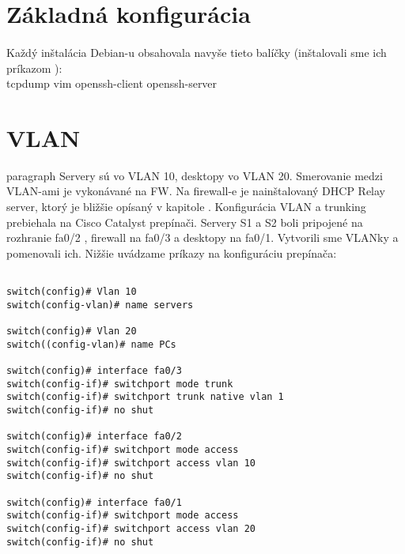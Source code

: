 \section{Základná konfigurácia}
\paragraph{}
Každý inštalácia Debian-u obsahovala navyše tieto balíčky (inštalovali sme ich príkazom ):\\
tcpdump vim openssh-client openssh-server

\section{VLAN}
paragraph{}
Servery sú vo VLAN 10, desktopy vo VLAN 20. Smerovanie medzi VLAN-ami je vykonávané na FW. Na firewall-e je nainštalovaný DHCP Relay server, ktorý je bližšie opísaný v kapitole . Konfigurácia VLAN a trunking prebiehala na Cisco Catalyst prepínači. Servery S1 a S2 boli pripojené na rozhranie fa0/2 , firewall na fa0/3 a desktopy na fa0/1. Vytvorili sme VLANky a pomenovali ich. Nižšie uvádzame príkazy na konfiguráciu prepínača: 


\noindent
{\selectfont

\begin{small}

\begin{verbatim}

switch(config)# Vlan 10
switch(config-vlan)# name servers

switch(config)# Vlan 20
switch((config-vlan)# name PCs

switch(config)# interface fa0/3
switch(config-if)# switchport mode trunk
switch(config-if)# switchport trunk native vlan 1
switch(config-if)# no shut

switch(config)# interface fa0/2
switch(config-if)# switchport mode access 
switch(config-if)# switchport access vlan 10
switch(config-if)# no shut

switch(config)# interface fa0/1
switch(config-if)# switchport mode access 
switch(config-if)# switchport access vlan 20
switch(config-if)# no shut

\end{verbatim}

\end{small}

}


